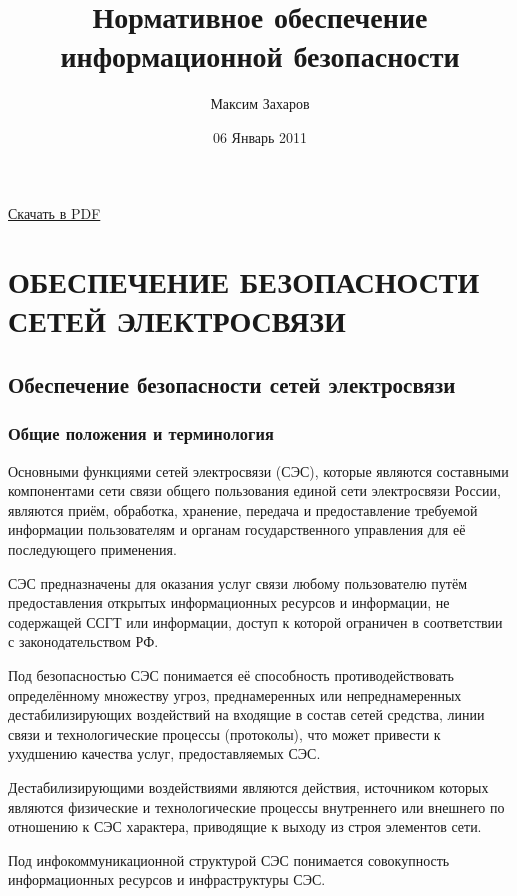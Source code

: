 \documentclass[12pt, russian, oneside, article]{ncc}
\begin{document}
\title{Нормативное обеспечение информационной безопасности}
\author{Максим Захаров}
\date{06 Январь 2011}
\maketitle

\setcounter{tocdepth}{3}
\tableofcontents
\vspace*{1cm}


\href{file:///home/maxim/Documents/Git/lectures/other/NOIB_Lectures.pdf}{Скачать в PDF}

\section{ОБЕСПЕЧЕНИЕ БЕЗОПАСНОСТИ СЕТЕЙ ЭЛЕКТРОСВЯЗИ}
\label{sec-1}
\subsection{Обеспечение безопасности сетей электросвязи}
\label{sec-1_1}
\subsubsection{Общие положения и терминология}
\label{sec-1_1_1}


Основными функциями сетей электросвязи (СЭС), которые являются составными компонентами сети связи общего пользования единой сети электросвязи России, являются приём, обработка, хранение, передача и предоставление требуемой информации пользователям и органам государственного управления для её последующего применения.

СЭС предназначены для оказания услуг связи любому пользователю путём предоставления открытых информационных ресурсов и информации, не содержащей ССГТ или информации, доступ к которой ограничен в соответствии с законодательством РФ.

Под безопасностью СЭС понимается её способность противодействовать определённому множеству угроз, преднамеренных или непреднамеренных дестабилизирующих воздействий на входящие в состав сетей средства, линии связи и технологические процессы (протоколы), что может привести к ухудшению качества услуг, предоставляемых СЭС.

Дестабилизирующими воздействиями являются действия, источником которых являются физические и технологические процессы внутреннего или внешнего по отношению к СЭС характера, приводящие к выходу из строя элементов сети.

Под инфокоммуникационной структурой СЭС понимается совокупность информационных ресурсов и инфраструктуры СЭС.
\end{document}
